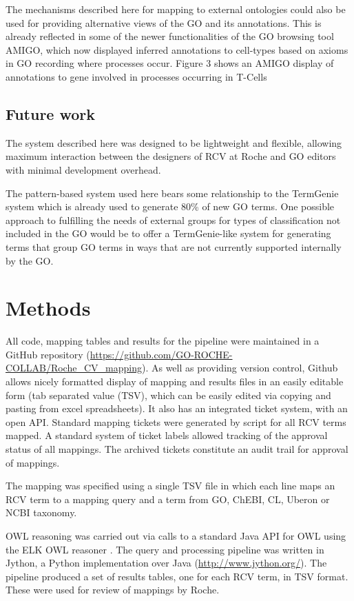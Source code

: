 \documentclass[runningheads,a4paper]{llncs}
\begin{document}
{{The mechanisms described here for mapping to external ontologies could also be used for providing alternative views of the GO and its annotations.  This is already reflected in some of the newer functionalities of the GO browsing tool AMIGO, which now displayed inferred annotations to cell-types based on axioms in GO recording where processes occur.  Figure 3 shows an AMIGO display of annotations to gene involved in processes occurring in T-Cells

\subsection{Future work}

The system described here was designed to be lightweight and flexible, allowing maximum interaction between the designers of RCV at Roche and GO editors with minimal development overhead.

The pattern-based system used here bears some relationship to the TermGenie system \cite{Dietze2014} which is already used to generate 80\% of new GO terms.  One possible approach to fulfilling the needs of external groups for types of classification not included in the GO would be to offer a TermGenie-like system for generating terms that group GO terms in ways that are not currently supported internally by the GO.


\section{Methods}

All code, mapping tables and results for the pipeline were maintained in a GitHub repository (\url{https://github.com/GO-ROCHE-COLLAB/Roche_CV_mapping}). As well as providing version control, Github allows nicely formatted display of mapping and results files in an easily editable form (tab separated value (TSV), which can be easily edited via copying and pasting from excel spreadsheets). It also has an integrated ticket system, with an open API.  Standard mapping tickets were generated by script for all RCV terms mapped. A standard system of ticket labels allowed tracking of the approval status of all mappings.  The archived tickets constitute an audit trail for approval of mappings.

The mapping was specified using a single TSV file in which each line maps an RCV term to a mapping query and a term from GO, ChEBI, CL, Uberon or NCBI taxonomy.

OWL reasoning was carried out via calls to a standard Java API for OWL using the ELK OWL reasoner \cite{kazakov2012}.  The query and processing pipeline was written in Jython, a Python implementation over Java (\url{http://www.jython.org/}).  The pipeline produced a set of results tables, one for each RCV term, in TSV format.  These were used for review of mappings by Roche. 




}}
\end{document}
